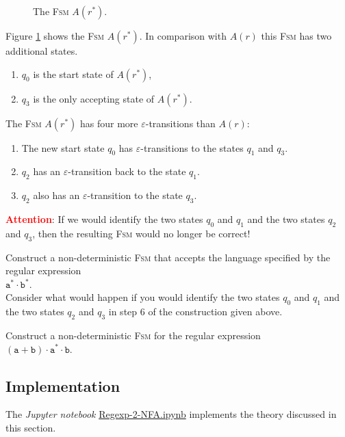 \begin{enumerate}
      \begin{figure}[!ht]
        \centering
      \caption{The \textsc{Fsm} $A(r^*)$.}
      \label{fig:aStar.eps}
      \end{figure}
      Figure \ref{fig:aStar.eps} shows the \textsc{Fsm} $A(r^*)$.
      In comparison with $A(r)$ this \textsc{Fsm} has two additional states.
      \begin{enumerate}
      \item $q_0$ is the start state of $A(r^*)$,
      \item $q_3$ is the only accepting state of $A(r^*)$.
      \end{enumerate}
      The \textsc{Fsm} $A(r^*)$ has four more $\varepsilon$-transitions than $A(r)$: 
      \begin{enumerate}
      \item The new start state  $q_0$ has $\varepsilon$-transitions to the states
            $q_1$ and $q_3$.
      \item $q_2$ has an $\varepsilon$-transition back to the state $q_1$.
      \item $q_2$ also has an $\varepsilon$-transition to the state $q_3$.
      \end{enumerate}
      \textbf{\textcolor{red}{Attention}}:  If we would identify the two states 
      $q_0$ and $q_1$ and the two states $q_2$ and $q_3$, then the resulting \textsc{Fsm} would no longer be
      correct!
\end{enumerate}

\exerciseEng
Construct a non-deterministic \textsc{Fsm} that accepts the language specified by the regular expression
\\[0.2cm]
\hspace*{1.3cm}
$\texttt{a}^* \cdot \texttt{b}^*$.
\\[0.2cm]
Consider what would happen if you would identify the two states 
$q_0$ and $q_1$ and the two states $q_2$ and $q_3$ in step 6 of the construction given above. 
\eox

\exerciseEng
Construct a non-deterministic \textsc{Fsm} for the regular expression
\\[0.2cm]
\hspace*{1.3cm}
$(\texttt{a} + \texttt{b}) \cdot \texttt{a}^* \cdot \texttt{b}$.  
\eox

\subsection{Implementation}
The \textsl{Jupyter notebook}
\href{https://github.com/karlstroetmann/Formal-Languages/blob/master/Python/Chapter-4/Regexp-2-NFA.ipynb}{Regexp-2-NFA.ipynb} 
implements the theory discussed in this section.



